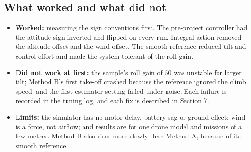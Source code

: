 

\subsection{What worked and what did not}
\begin{itemize}[itemsep=0pt,topsep=2pt]
\item \textbf{Worked:} measuring the sign conventions first. The pre-project controller had the attitude sign inverted and flipped on every run. Integral action removed the altitude offset and the wind offset. The smooth reference reduced tilt and control effort and made the system tolerant of the roll gain.
\item \textbf{Did not work at first:} the sample's roll gain of 50 was unstable for larger tilt; Method B's first take-off crashed because the reference ignored the climb speed; and the first estimator setting failed under noise. Each failure is recorded in the tuning log, and each fix is described in Section 7.
\item \textbf{Limits:} the simulator has no motor delay, battery sag or ground effect; wind is a force, not airflow; and results are for one drone model and missions of a few metres. Method B also rises more slowly than Method A, because of its smooth reference.
\end{itemize}
